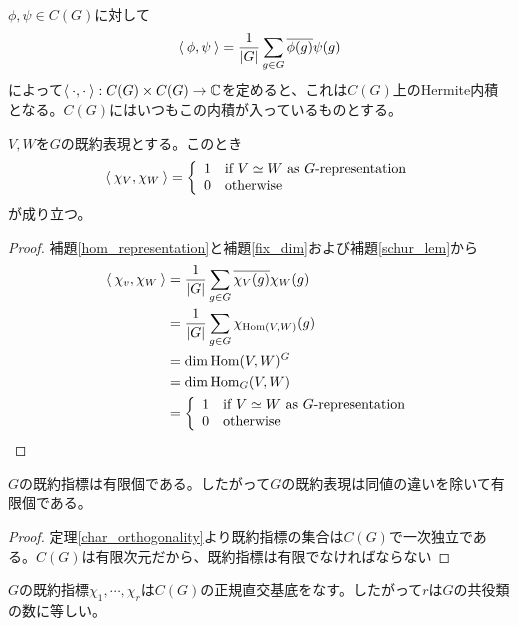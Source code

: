 \documentclass{ltjsreport}
\begin{document}
\begin{defin}
  $\phi,\psi\in C(G)$に対して
  \[
  \langle\:\phi,\psi\:\rangle=\frac{1}{|G|}\sum_{g\in G}\overline{\phi(g)}\psi(g)  
  \]
  によって$\langle\:\cdot,\cdot\:\rangle:C(G)\times C(G)\rightarrow \mathbb{C}$を定めると、これは$C(G)$上のHermite内積となる。$C(G)$にはいつもこの内積が入っているものとする。
\end{defin}

\begin{theo}[指標の直交関係]\label{char_orthogonality}
  $V,W$を$G$の既約表現とする。このとき
  \[
  \langle\:\chi_V,\chi_W\:\rangle=\left\{\begin{array}{cl}
    1 & \text{if $V\simeq W$ as $G$-representation}\\
    0 & \text{otherwise}
  \end{array}\right.  
  \]
  が成り立つ。
\end{theo}

\begin{proof}
  補題\ref{hom_representation}と補題\ref{fix_dim}および補題\ref{schur_lem}から
  \begin{align*}
    \langle\:\chi_v,\chi_W\:\rangle&=\frac{1}{|G|}\sum_{g\in G}\overline{\chi_V(g)}\chi_W(g)\\
    &=\frac{1}{|G|}\sum_{g\in G}\chi_{\text{Hom}(V,W)}(g)\\
    &=\dim \text{Hom}(V,W)^G\\
    &=\dim \text{Hom}_G(V,W)\\
    &=\left\{\begin{array}{cl}
      1 & \text{if $V\simeq W$ as $G$-representation}\\
      0 & \text{otherwise}
    \end{array}\right.  
  \end{align*}
\end{proof}


\begin{cor}
  $G$の既約指標は有限個である。したがって$G$の既約表現は同値の違いを除いて有限個である。
\end{cor}

\begin{proof}
  定理\ref{char_orthogonality}より既約指標の集合は$C(G)$で一次独立である。$C(G)$は有限次元だから、既約指標は有限でなければならない
\end{proof}

\begin{cor}\label{irr_char_is_basis}
  $G$の既約指標$\chi_1,\cdots,\chi_r$は$C(G)$の正規直交基底をなす。したがって$r$は$G$の共役類の数に等しい。
\end{cor}
\end{document}
